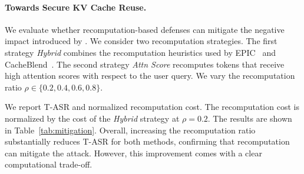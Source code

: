 \paragraph{Towards Secure KV Cache Reuse.}
We evaluate whether recomputation-based defenses can mitigate the negative impact introduced by \sys. We consider two recomputation strategies. The first strategy \textit{Hybrid} combines the recomputation heuristics used by EPIC~\cite{hu2025epic} and CacheBlend~\cite{yao2025cacheblend}. The second strategy \textit{Attn Score} recomputes tokens that receive high attention scores with respect to the user query. We vary the recomputation ratio $\rho \in \{0.2, 0.4, 0.6, 0.8\}$.

We report T-ASR and normalized recomputation cost. The recomputation cost is normalized by the cost of the \textit{Hybrid} strategy at $\rho=0.2$. The results are shown in Table~\ref{tab:mitigation}. Overall, increasing the recomputation ratio substantially reduces T-ASR for both methods, confirming that recomputation can mitigate the attack. However, this improvement comes with a clear computational trade-off. 